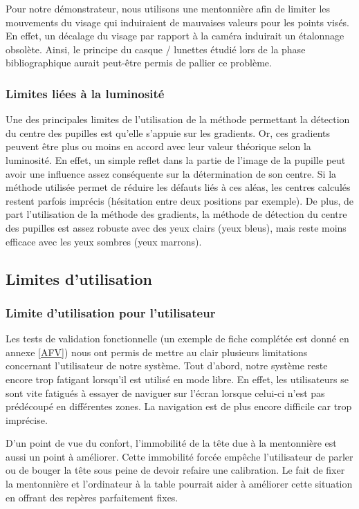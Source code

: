 Pour notre démonstrateur, nous utilisons une mentonnière afin de limiter les mouvements du visage qui induiraient de mauvaises valeurs pour les points visés. En effet, un décalage du visage par rapport à la caméra induirait un étalonnage obsolète. Ainsi, le principe du casque / lunettes étudié lors de la phase bibliographique aurait peut-être permis de pallier ce problème.

\subsubsection{Limites liées à la luminosité}

Une des principales limites de l’utilisation de la méthode permettant la détection du centre des pupilles est qu’elle s’appuie sur les gradients. Or, ces gradients peuvent être plus ou moins en accord avec leur valeur théorique selon la luminosité. En effet, un simple reflet dans la partie de l’image de la pupille peut avoir une influence assez conséquente sur la détermination de son centre. Si la méthode utilisée permet de réduire les défauts liés à ces aléas, les centres calculés restent parfois imprécis (hésitation entre deux positions par exemple). De plus, de part l’utilisation de la méthode des gradients, la méthode de détection du centre des pupilles est assez robuste avec des yeux clairs (yeux bleus), mais reste moins efficace avec les yeux sombres (yeux marrons).

\subsection{Limites d'utilisation}

\subsubsection{Limite d’utilisation pour l’utilisateur}

Les tests de validation fonctionnelle (un exemple de fiche complétée est donné en annexe \ref{AFV}) nous ont permis de mettre au clair plusieurs limitations concernant l’utilisateur de notre système. Tout d’abord, notre système reste encore trop fatigant lorsqu’il est utilisé en mode libre. En effet, les utilisateurs se sont vite fatigués à essayer de naviguer sur l’écran lorsque celui-ci n’est pas prédécoupé en différentes zones. La navigation est de plus encore difficile car trop imprécise.

D’un point de vue du confort, l’immobilité de la tête due à la mentonnière est aussi un point à améliorer. Cette immobilité forcée empêche l’utilisateur de parler ou de bouger la tête sous peine de devoir refaire une calibration. Le fait de fixer la mentonnière et l’ordinateur à la table pourrait aider à améliorer cette situation en offrant des repères parfaitement fixes.

